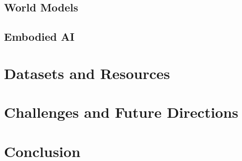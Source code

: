 \documentclass{article}
\begin{document}
\subsection{World Models}

\subsection{Embodied AI}

\section{Datasets and Resources}
\label{sec:datasets}


\section{Challenges and Future Directions}
\label{sec:challenges}


\section{Conclusion}
\label{sec:conclusion}





\end{document}
